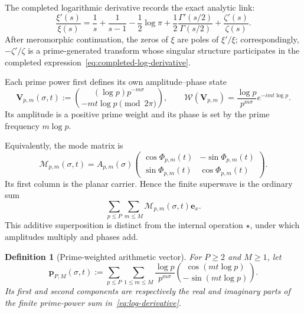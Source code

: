 \documentclass[11pt]{article}
\newtheorem{definition}{Definition}[section]
\begin{document}
The completed logarithmic derivative records the exact analytic link:
\begin{equation}\label{eq:completed-log-derivative}
 \frac{\xi'(s)}{\xi(s)}=
 \frac1s+\frac1{s-1}-\frac12\log\pi
 +\frac12\frac{\Gamma'(s/2)}{\Gamma(s/2)}
 +\frac{\zeta'(s)}{\zeta(s)}.
\end{equation}
After meromorphic continuation, the zeros of $\xi$ are poles of $\xi'/\xi$; correspondingly,
$-\zeta'/\zeta$ is a prime-generated transform whose singular structure participates in the
completed expression~\eqref{eq:completed-log-derivative}.

Each prime power first defines its own amplitude--phase state
\begin{equation}\label{eq:prime-mode-state}
 \mathbf V_{p,m}(\sigma,t)
 :=\binom{(\log p)p^{-m\sigma}}{-mt\log p\pmod{2\pi}},
 \qquad
 \mathcal W(\mathbf V_{p,m})
 =\frac{\log p}{p^{m\sigma}}e^{-imt\log p}.
\end{equation}
Its amplitude is a positive prime weight and its phase is set by the prime frequency
$m\log p$.

Equivalently, the mode matrix is
\begin{equation}\label{eq:prime-mode-matrix}
 \mathcal M_{p,m}(\sigma,t)
 =A_{p,m}(\sigma)
 \begin{pmatrix}
 \cos\Phi_{p,m}(t)&-\sin\Phi_{p,m}(t)\\
 \sin\Phi_{p,m}(t)& \cos\Phi_{p,m}(t)
 \end{pmatrix}.
\end{equation}
Its first column is the planar carrier.  Hence the finite superwave is the ordinary sum
\begin{equation}\label{eq:finite-matrix-superwave}
 \sum_{p\le P}\sum_{m\le M}\mathcal M_{p,m}(\sigma,t)\mathbf e_x.
\end{equation}
This additive superposition is distinct from the internal operation $\star$, under which
amplitudes multiply and phases add.

\begin{definition}[Prime-weighted arithmetic vector]\label{def:prime-vector}
For $P\ge2$ and $M\ge1$, let
\begin{equation}\label{eq:prime-vector}
 \boxed{
 \mathbf p_{P,M}(\sigma,t)
 :=\sum_{p\le P}\sum_{1\le m\le M}
 \frac{\log p}{p^{m\sigma}}
 \binom{\cos(mt\log p)}{-\sin(mt\log p)}.}
\end{equation}
Its first and second components are respectively the real and imaginary parts of the finite
prime-power sum in~\eqref{eq:log-derivative}.
\end{definition}
\end{document}
